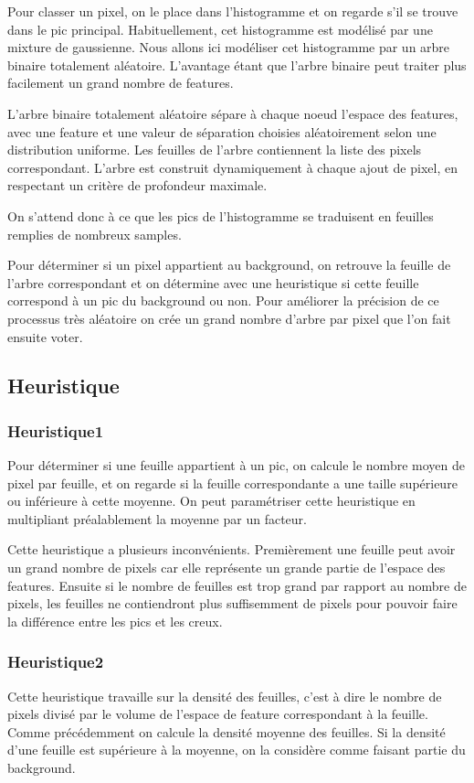 \documentclass[8pt,a4paper]{article}
\begin{document}
\begin{multicols}{2}
	Pour classer un pixel, on le place dans l'histogramme et on regarde s'il se trouve dans le pic principal. 
	Habituellement, cet histogramme est modélisé par une mixture de gaussienne. Nous allons ici modéliser cet
	histogramme par un arbre binaire totalement aléatoire. L'avantage étant que l'arbre binaire peut traiter
	plus facilement un grand nombre de features.

	L'arbre binaire totalement aléatoire sépare à chaque noeud l'espace des features, avec une feature et une
	valeur de séparation choisies aléatoirement selon une distribution uniforme. Les feuilles de l'arbre 
	contiennent la liste des pixels correspondant. L'arbre est construit dynamiquement à chaque ajout de pixel,
	en respectant un critère de profondeur maximale.

	On s'attend donc à ce que les pics de l'histogramme se traduisent en feuilles remplies de nombreux samples.

	Pour déterminer si un pixel appartient au background, on retrouve la feuille de l'arbre correspondant et on
	détermine avec une heuristique si cette feuille correspond à un pic du background ou non. Pour améliorer
	la précision de ce processus très aléatoire on crée un grand nombre d'arbre par pixel que l'on fait ensuite
	voter.

	\subsection{Heuristique}
		\subsubsection{Heuristique1}
			Pour déterminer si une feuille appartient à un pic, on calcule le nombre moyen de pixel par
			feuille, et on regarde si la feuille correspondante a une taille supérieure ou inférieure
			à cette moyenne. On peut paramétriser cette heuristique en multipliant préalablement la moyenne
			par un facteur.

			Cette heuristique a plusieurs inconvénients. Premièrement une feuille peut avoir un grand nombre
			de pixels car elle représente un grande partie de l'espace des features. Ensuite si le nombre de
			feuilles est trop grand par rapport au nombre de pixels, les feuilles ne contiendront plus suffisemment
			de pixels pour pouvoir faire la différence entre les pics et les creux.
		\subsubsection{Heuristique2}
			Cette heuristique travaille sur la densité des feuilles, c'est à dire le nombre de pixels divisé par le
			volume de l'espace de feature correspondant à la feuille.  Comme précédemment on calcule la densité 
			moyenne des feuilles. Si la densité d'une feuille est supérieure à la moyenne, on la considère comme faisant
			partie du background.


\end{multicols}
\end{document}
